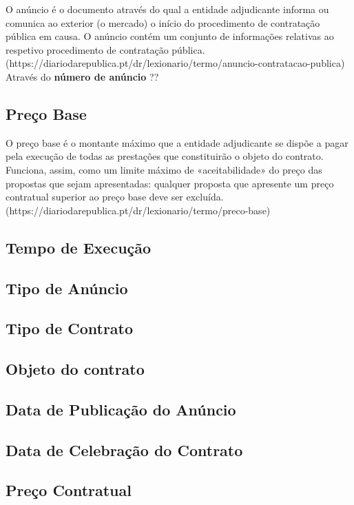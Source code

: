 O anúncio é o documento através do qual a entidade adjudicante informa ou comunica ao exterior (o mercado) o início do procedimento de contratação pública em causa. O anúncio contém um conjunto de informações relativas ao respetivo procedimento de contratação pública.(https://diariodarepublica.pt/dr/lexionario/termo/anuncio-contratacao-publica) 
Através do \textbf{número de anúncio} ??

\subsection{Preço Base}

O preço base é o montante máximo que a entidade adjudicante se dispõe a pagar pela execução de todas as prestações que constituirão o objeto do contrato. Funciona, assim, como um limite máximo de «aceitabilidade» do preço das propostas que sejam apresentadas: qualquer proposta que apresente um preço contratual superior ao preço base deve ser excluída. (https://diariodarepublica.pt/dr/lexionario/termo/preco-base)

\subsection{Tempo de Execução}

\subsection{Tipo de Anúncio}

\subsection{Tipo de Contrato}

\subsection{Objeto do contrato}

\subsection{Data de Publicação do Anúncio}

\subsection{Data de Celebração do Contrato}

\subsection{Preço Contratual}

